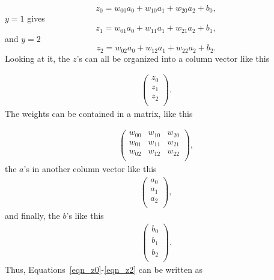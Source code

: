 \documentclass[12pt]{article}
\begin{document}
\begin{equation}
z_0=w_{00} a_0 + w_{10}a_1 + w_{20}a_2 + b_0,
\label{eqn_z0}
\end{equation}
$y=1$ gives
\begin{equation}
z_1=w_{01} a_0 + w_{11}a_1 + w_{21}a_2 + b_1,
\label{eqn_z1}
\end{equation}
and $y=2$
\begin{equation}
z_2=w_{02} a_0 + w_{12}a_1 + w_{22}a_2 + b_2.
\label{eqn_z2}
\end{equation}
Looking at it, the $z$'s can all be organized into a column vector like this

\begin{align}
     \begin{pmatrix}
           z_{0} \\
           z_{1} \\
           z_{2} \\
         \end{pmatrix}.
  \end{align}
  The weights can be contained in a matrix, like this
  
  \begin{align}
    \begin{pmatrix}
           w_{00} &w_{10} & w_{20}  \\
           w_{01} &w_{11} & w_{21}  \\
  	  w_{02} &w_{12} & w_{22} \\
         \end{pmatrix},
  \end{align}
  the $a$'s in another column vector like this
  \begin{align}
    \begin{pmatrix}
           a_{0} \\
           a_{1} \\
           a_{2} \\
         \end{pmatrix},
  \end{align}
  and finally, the $b$'s like this
    \begin{align}
    \begin{pmatrix}
           b_{0} \\
           b_{1} \\
           b_{2} \\
         \end{pmatrix}.
  \end{align}
Thus, Equations~\ref{eqn_z0}-\ref{eqn_z2} can be written as
\end{document}
